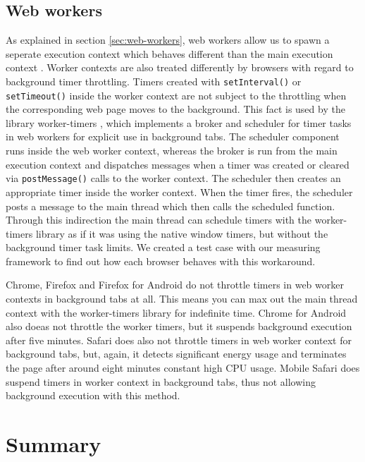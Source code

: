 \documentclass[
	ruledheaders=section,%
	class=report,%
	thesis={type=bachelor},%
	accentcolor=9c,%
	custommargins=true,%
	marginpar=false,%
	parskip=half-,%
	fontsize=11pt,%
]{tudapub}
\begin{document}
  
  \subsection{Web workers}

  As explained in section \ref{sec:web-workers}, web workers allow us to spawn a seperate execution context which behaves different than the main execution context \cite{mdn-worker}. Worker contexts are also treated differently by browsers with regard to background timer throttling. Timers created with \texttt{setInterval()} or \texttt{setTimeout()} inside the worker context are not subject to the throttling when the corresponding web page moves to the background. This fact is used by the library worker-timers \cite{worker-timers}, which implements a broker and scheduler for timer tasks in web workers for explicit use in background tabs. The scheduler component runs inside the web worker context, whereas the broker is run from the main execution context and dispatches messages when a timer was created or cleared via \texttt{postMessage()} calls to the worker context. The scheduler then creates an appropriate timer inside the worker context. When the timer fires, the scheduler posts a message to the main thread which then calls the scheduled function. Through this indirection the main thread can schedule timers with the worker-timers library as if it was using the native window timers, but without the background timer task limits. We created a test case with our measuring framework to find out how each browser behaves with this workaround.
  
  Chrome, Firefox and Firefox for Android do not throttle timers in web worker contexts in background tabs at all. This means you can max out the main thread context with the worker-timers library for indefinite time. Chrome for Android also doeas not throttle the worker timers, but it suspends background execution after five minutes. Safari does also not throttle timers in web worker context for background tabs, but, again, it detects significant energy usage and terminates the page after around eight minutes constant high CPU usage. Mobile Safari does suspend timers in worker context in background tabs, thus not allowing background execution with this method.
  
  
  \section{Summary}
\end{document}
